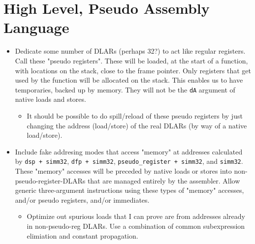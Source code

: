 \documentclass{article}
\begin{document}
\section{High Level, Pseudo Assembly Language}
	\begin{itemize}
	\item Dedicate some number of DLARs (perhaps 32?) to act like regular
		registers. Call these "pseudo registers". These will be loaded, at
		the start of a function, with locations on the stack, close to the
		frame pointer. Only registers that get used by the function will be
		allocated on the stack. This enables us to have temporaries, backed
		up by memory. They will not be the \texttt{dA} argument of native
		loads and stores.
		\begin{itemize}
		\item It should be possible to do spill/reload of these pseudo
			registers by just changing the address (load/store) of the real
			DLARs (by way of a native load/store).
		\end{itemize}
	\item Include fake addresing modes that access "memory" at addresses
		calculated by \texttt{dsp + simm32}, \texttt{dfp + simm32},
		\texttt{pseudo\_register + simm32}, and \texttt{simm32}. These
		"memory" accesses will be preceded by native loads or stores into
		non-pseudo-register-DLARs that are managed entirely by the
		assembler. Allow generic three-argument instructions using these
		types of "memory" accesses, and/or pseudo registers, and/or
		immediates.
		\begin{itemize}
		\item Optimize out spurious loads that I can prove are from
			addresses already in non-pseudo-reg DLARs. Use a combination of
			common subexpression elimiation and constant propagation.
		\end{itemize}
	\end{itemize}


\end{document}
